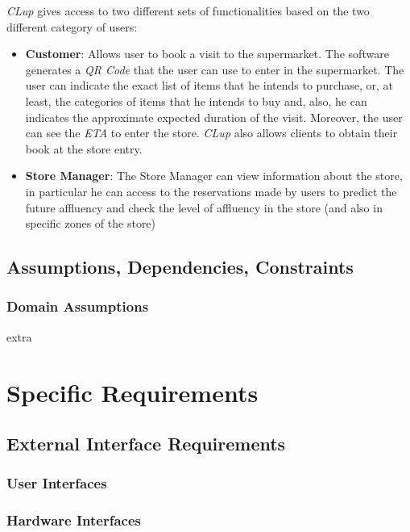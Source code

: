 \documentclass{article}
\begin{document}
	\emph{CLup} gives access to two different sets of functionalities based on the two different category of users:
	
	\begin{itemize}
		
		\item {\bfseries Customer}: Allows user to book a visit to the supermarket. The software generates a \emph{QR Code} that the user can use to enter in the supermarket. The user can indicate the exact list of items that he intends to purchase, or, at least, the categories of items that he intends to buy and, also, he can indicates the approximate expected duration of the visit. Moreover, the user can see the \emph{ETA} to enter the store. \emph{CLup} also allows clients to obtain their book at the store entry.\\
		
		\item {\bfseries Store Manager}: The Store Manager can view information about the store, in particular he can access to the reservations made by users to predict the future affluency and check the level of affluency in the store (and also in specific zones of the store) \\
		
	\end{itemize}

	\subsection{Assumptions, Dependencies, Constraints}
	
		\subsubsection{Domain Assumptions}
		
		extra


\section{Specific Requirements}
	\subsection{External Interface Requirements}
		\subsubsection{User Interfaces}
		\subsubsection{Hardware Interfaces}
\end{document}
